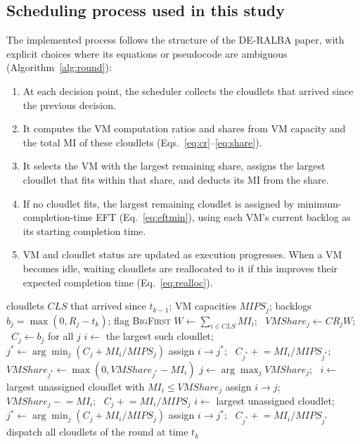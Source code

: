 \documentclass[default,sn-mathphys,Numbered]{sn-jnl}
\begin{document}
\subsection{Scheduling process used in this study}
The implemented process follows the structure of the DE-RALBA paper, with explicit choices where its equations or pseudocode are ambiguous (Algorithm~\ref{alg:round}):
\begin{enumerate}
    \item At each decision point, the scheduler collects the cloudlets that arrived since the previous decision.
    \item It computes the VM computation ratios and shares from VM capacity and the total MI of these cloudlets (Eqs.~\ref{eq:cr}--\ref{eq:share}).
    \item It selects the VM with the largest remaining share, assigns the largest cloudlet that fits within that share, and deducts its MI from the share.
    \item If no cloudlet fits, the largest remaining cloudlet is assigned by minimum-completion-time EFT (Eq.~\ref{eq:eftmin}), using each VM's current backlog as its starting completion time.
    \item VM and cloudlet status are updated as execution progresses. When a VM becomes idle, waiting cloudlets are reallocated to it if this improves their expected completion time (Eq.~\ref{eq:realloc}).
\end{enumerate}

\begin{algorithm}[h]
\caption{One DE-RALBA round at decision time $t_k$ (corrected interpretation)}\label{alg:round}
\begin{algorithmic}[1]
\Require cloudlets $\mathit{CLS}$ that arrived since $t_{k-1}$; VM capacities $\mathit{MIPS}_j$; backlogs $b_j = \max(0, R_j - t_k)$; flag \textsc{BigFirst}
\State $W \gets \sum_{i \in \mathit{CLS}} \mathit{MI}_i$; \ $\mathit{VMShare}_j \gets \mathit{CR}_j W$; \ $C_j \gets b_j$ for all $j$
    \State $i \gets$ the largest such cloudlet; \ $j^* \gets \arg\min_j (C_j + \mathit{MI}_i/\mathit{MIPS}_j)$
    \State assign $i \to j^*$; \ $C_{j^*} \mathrel{+}= \mathit{MI}_i/\mathit{MIPS}_{j^*}$; \ $\mathit{VMShare}_{j^*} \gets \max(0, \mathit{VMShare}_{j^*} - \mathit{MI}_i)$
  \EndWhile
\EndIf
{}
  \State $j \gets \arg\max_j \mathit{VMShare}_j$; \ $i \gets$ largest unassigned cloudlet with $\mathit{MI}_i \le \mathit{VMShare}_j$
    \State assign $i \to j$; \ $\mathit{VMShare}_j \mathrel{-}= \mathit{MI}_i$; \ $C_j \mathrel{+}= \mathit{MI}_i/\mathit{MIPS}_j$ 
  \Else
    \State $i \gets$ largest unassigned cloudlet; \ $j^* \gets \arg\min_j (C_j + \mathit{MI}_i/\mathit{MIPS}_j)$ 
    \State assign $i \to j^*$; \ $C_{j^*} \mathrel{+}= \mathit{MI}_i/\mathit{MIPS}_{j^*}$
  \EndIf
\EndWhile
\State dispatch all cloudlets of the round at time $t_k$
\end{algorithmic}
\end{algorithm}
\end{document}
